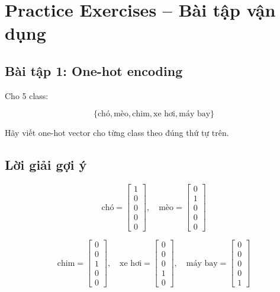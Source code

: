 \section{Practice Exercises -- Bài tập vận dụng}

\subsection*{Bài tập 1: One-hot encoding}

Cho 5 class:

\[
    \{\text{chó}, \text{mèo}, \text{chim}, \text{xe hơi}, \text{máy bay}\}
\]

Hãy viết one-hot vector cho từng class theo đúng thứ tự trên.

\subsection*{Lời giải gợi ý}

\[
    \text{chó} =
    \begin{bmatrix}
    1\\0\\0\\0\\0
    \end{bmatrix},
    \quad
    \text{mèo} =
    \begin{bmatrix}
    0\\1\\0\\0\\0
    \end{bmatrix}
\]

\[
    \text{chim} =
    \begin{bmatrix}
    0\\0\\1\\0\\0
    \end{bmatrix},
    \quad
    \text{xe hơi} =
    \begin{bmatrix}
    0\\0\\0\\1\\0
    \end{bmatrix},
    \quad
    \text{máy bay} =
    \begin{bmatrix}
    0\\0\\0\\0\\1
    \end{bmatrix}
\]

